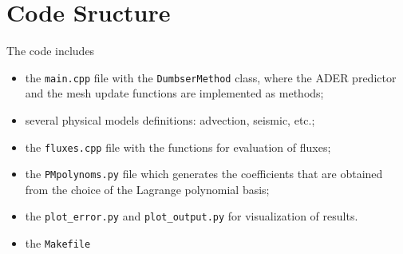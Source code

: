 \documentclass{article}
\begin{document}
\section{Code Sructure}\label{sec:algorithm}
The code includes 
\begin{itemize}
  \item the \lstinline{main.cpp} file with  the \lstinline{DumbserMethod} class, where the ADER predictor and the mesh update functions are implemented as methods;
  \item several physical models definitions: advection, seismic, etc.;
  \item the \lstinline{fluxes.cpp} file with the functions for evaluation of fluxes;
  \item the \lstinline{PMpolynoms.py} file which generates the coefficients that are obtained from the choice of the Lagrange polynomial basis;
  \item the \lstinline{plot_error.py} and \lstinline{plot_output.py} for visualization of results. 
  \item the \lstinline{Makefile}
\end{itemize}
\end{document}
